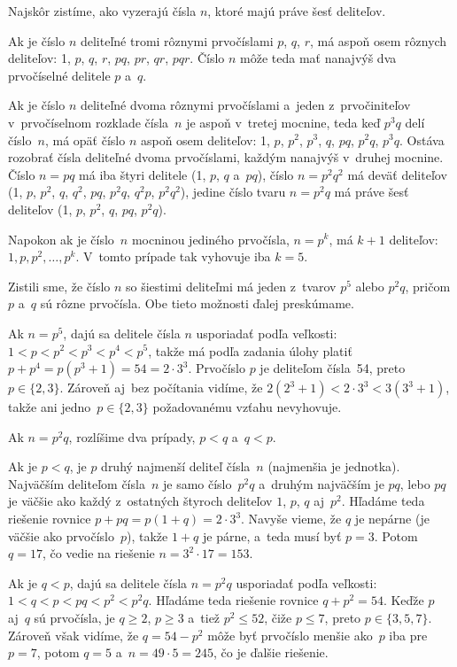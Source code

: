 {%
Najskôr zistíme, ako vyzerajú čísla $n$, ktoré majú práve šesť deliteľov.

Ak je číslo $n$ deliteľné tromi rôznymi prvočíslami $p$, $q$, $r$,
má aspoň osem rôznych deliteľov: 1, $p$, $q$, $r$,
$pq$, $pr$, $qr$, $pqr$. Číslo $n$ môže teda mať nanajvýš dva
prvočíselné delitele $p$ a~$q$.

Ak je číslo $n$ deliteľné dvoma rôznymi prvočíslami a~jeden z~prvočiniteľov v~prvočíselnom rozklade čísla~$n$ je aspoň
v~tretej mocnine, teda keď $p^3q$ delí číslo~$n$, má opäť číslo $n$ aspoň
osem deliteľov: 1, $p$, $p^2$, $p^3$, $q$, $pq$, $p^2q$, $p^3q$. Ostáva rozobrať čísla deliteľné dvoma prvočíslami, každým nanajvýš v~druhej mocnine.
Číslo $n = pq$ má iba štyri delitele (1, $p$, $q$ a~$pq$), číslo $n = p^2q^2$
má deväť deliteľov (1, $p$, $p^2$, $q$, $q^2$, $pq$, $p^2q$, $q^2p$, $p^2q^2$), jedine
číslo tvaru $n = p^2q$ má práve šesť deliteľov (1, $p$, $p^2$, $q$, $pq$, $p^2q$).

Napokon ak je číslo~$n$ mocninou jediného prvočísla, $n = p^k$,
má $k+1$ deliteľov: $1, p,\allowbreak p^2, \dots, p^k$. V~tomto prípade tak
vyhovuje iba $k= 5$.

Zistili sme, že číslo $n$ so šiestimi deliteľmi má jeden z~tvarov $p^5$ alebo $p^2q$,
pričom $p$ a~$q$ sú rôzne prvočísla. Obe tieto možnosti ďalej preskúmame.

Ak $n = p^5$, dajú sa delitele čísla $n$ usporiadať podľa veľkosti:
$1<p<p^2<p^3<p^4<p^5$, takže má podľa zadania úlohy platiť
$p+p^4 = p(p^3+1) = 54 = 2 \cdot3^3$.
Prvočíslo $p$ je deliteľom čísla~54, preto $p\in\{2, 3\}$. Zároveň aj~bez
počítania vidíme, že $2(2^3+1)<2 \cdot3^3<3(3^3+1)$, takže ani jedno~$p\in\{2, 3\}$
požadovanému vzťahu nevyhovuje.

Ak $n = p^2q$, rozlíšime dva prípady, $p<q$ a~$q<p$.

Ak je $p<q$, je $p$ druhý najmenší deliteľ čísla~$n$ (najmenšia je
jednotka). Najväčším deliteľom čísla~$n$ je samo číslo~$p^2q$
a~druhým najväčším je $pq$, lebo
$pq$ je väčšie ako každý z~ostatných
štyroch deliteľov $1$, $p$, $q$ aj~$p^2$. Hľadáme teda
riešenie rovnice $p+pq = {p(1+q)} = 2\cdot3^3$. Navyše vieme, že $q$ je
nepárne (je väčšie ako prvočíslo~$p$), takže $1+q$ je párne, a~teda
musí byť $p = 3$. Potom $q = 17$, čo vedie na riešenie
$n = 3^2 \cdot17 = 153$.

Ak je $q<p$, dajú sa delitele čísla $n = p^2q$ usporiadať
podľa veľkosti: $1 <q <p <pq <p^2 <p^2q$. Hľadáme teda riešenie rovnice
$q+p^2 = 54$. Keďže $p$ aj~$q$ sú prvočísla, je $q\ge2$, $p\ge3$
a~tiež $p^2\le52$, čiže $p\le7$, preto $p \in \{3, 5, 7\}$.
Zároveň však vidíme, že $q= 54-p^2$ môže byť prvočíslo menšie ako~$p$
iba pre $p=7$, potom $q=5$ a~$n=49\cdot5=245$, čo je ďalšie riešenie.

}
